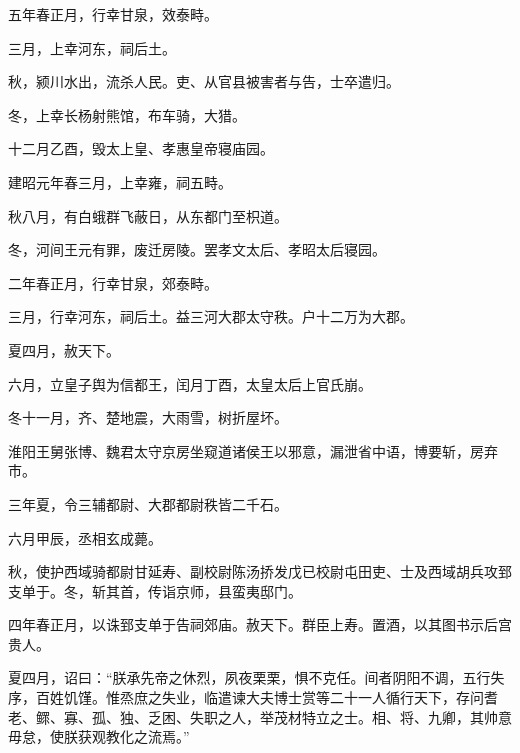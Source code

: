 \documentclass[12pt,UTF8]{ctexbook}
\begin{document}
五年春正月，行幸甘泉，效泰畤。



三月，上幸河东，祠后土。



秋，颍川水出，流杀人民。吏、从官县被害者与告，士卒遣归。



冬，上幸长杨射熊馆，布车骑，大猎。



十二月乙酉，毁太上皇、孝惠皇帝寝庙园。



建昭元年春三月，上幸雍，祠五畤。



秋八月，有白蛾群飞蔽日，从东都门至枳道。



冬，河间王元有罪，废迁房陵。罢孝文太后、孝昭太后寝园。



二年春正月，行幸甘泉，郊泰畤。



三月，行幸河东，祠后土。益三河大郡太守秩。户十二万为大郡。



夏四月，赦天下。



六月，立皇子舆为信都王，闰月丁酉，太皇太后上官氏崩。



冬十一月，齐、楚地震，大雨雪，树折屋坏。



淮阳王舅张博、魏君太守京房坐窥道诸侯王以邪意，漏泄省中语，博要斩，房弃市。



三年夏，令三辅都尉、大郡都尉秩皆二千石。



六月甲辰，丞相玄成薨。



秋，使护西域骑都尉甘延寿、副校尉陈汤挢发戊已校尉屯田吏、士及西域胡兵攻郅支单于。冬，斩其首，传诣京师，县蛮夷邸门。



四年春正月，以诛郅支单于告祠郊庙。赦天下。群臣上寿。置酒，以其图书示后宫贵人。



夏四月，诏曰：“朕承先帝之休烈，夙夜栗栗，惧不克任。间者阴阳不调，五行失序，百姓饥馑。惟烝庶之失业，临遣谏大夫博士赏等二十一人循行天下，存问耆老、鳏、寡、孤、独、乏困、失职之人，举茂材特立之士。相、将、九卿，其帅意毋怠，使朕获观教化之流焉。”
\end{document}
